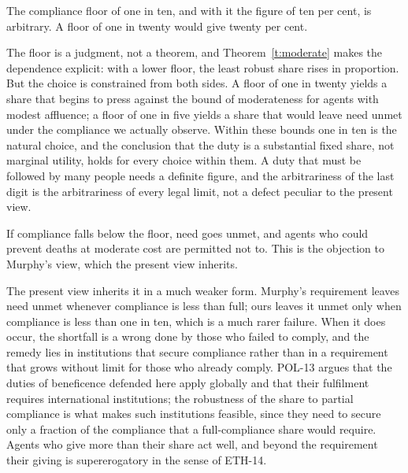 \documentclass{situationist-preprint}
\begin{document}
\begin{objection}[Arbitrariness]
The compliance floor of one in ten, and with it the figure of ten per cent, is arbitrary. A floor of one in twenty would give twenty per cent.
\end{objection}

\begin{reply}
The floor is a judgment, not a theorem, and Theorem~\ref{t:moderate} makes the dependence explicit: with a lower floor, the least robust share rises in proportion. But the choice is constrained from both sides. A floor of one in twenty yields a share that begins to press against the bound of moderateness for agents with modest affluence; a floor of one in five yields a share that would leave need unmet under the compliance we actually observe. Within these bounds one in ten is the natural choice, and the conclusion that the duty is a substantial fixed share, not marginal utility, holds for every choice within them. A duty that must be followed by many people needs a definite figure, and the arbitrariness of the last digit is the arbitrariness of every legal limit, not a defect peculiar to the present view.
\end{reply}

\begin{objection}
If compliance falls below the floor, need goes unmet, and agents who could prevent deaths at moderate cost are permitted not to. This is the objection to Murphy's view, which the present view inherits.
\end{objection}

\begin{reply}
The present view inherits it in a much weaker form. Murphy's requirement leaves need unmet whenever compliance is less than full; ours leaves it unmet only when compliance is less than one in ten, which is a much rarer failure. When it does occur, the shortfall is a wrong done by those who failed to comply, and the remedy lies in institutions that secure compliance rather than in a requirement that grows without limit for those who already comply. POL-13 argues that the duties of beneficence defended here apply globally and that their fulfilment requires international institutions; the robustness of the share to partial compliance is what makes such institutions feasible, since they need to secure only a fraction of the compliance that a full-compliance share would require. Agents who give more than their share act well, and beyond the requirement their giving is supererogatory in the sense of ETH-14.
\end{reply}
\end{document}
